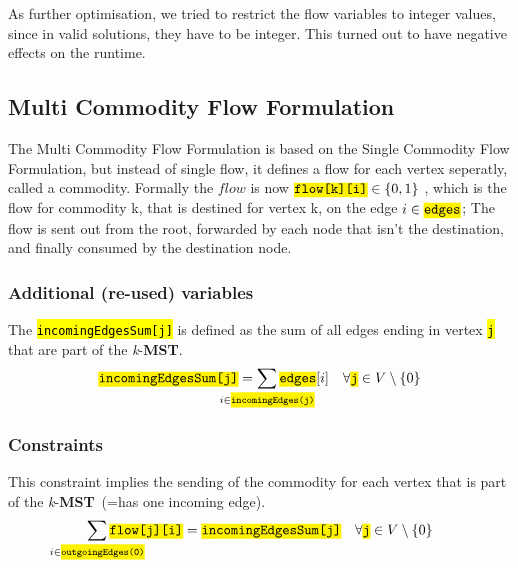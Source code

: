 \documentclass[,%
			paper=a4,%
			DIV14,
			liststotoc,
			bibtotoc,
			draft=false,%
			numbers=noendperiod
			]{scrartcl}
\newcommand{\mst}{\textbf{MST}}
\newcommand{\kmst}{\textit{k}-\mst}
\newcommand{\ilc}[1]{\hl{\texttt{#1}}} %
\newcommand{\commodity}{j}
\newcommand{\edge}{i}
\begin{document}
As further optimisation, we tried to restrict the flow variables to integer values, since in valid solutions, they have to be integer. This turned out to have negative effects on the runtime.

\subsection{Multi Commodity Flow Formulation}
The Multi Commodity Flow Formulation is based on the Single Commodity Flow Formulation, but instead of single flow, it defines a flow for each vertex seperatly, called a commodity. Formally the $flow$ is now $\ilc{flow[k][i]} \in \left\{0,1\right\}$ , which is the flow for commodity k, that is destined for vertex k, on the edge $i \in \ilc{edges}$; The flow is sent out from the root, forwarded by each node that isn't the destination, and finally consumed by the destination node.

\subsubsection{Additional (re-used) variables}
The \ilc{incomingEdgesSum[\commodity]} is defined as the sum of all edges ending in vertex \ilc{\commodity} that are part of the \kmst.
\begin{equation}\label{eq:mfcInEdges}
	\ilc{incomingEdgesSum[\commodity]} = \sum_{\mathclap{i \in \ilc{incomingEdges(\commodity)}}} \ilc{edges}[i]
\quad \forall \ilc{\commodity} \in V \setminus \{0\}
\end{equation}


\subsubsection{Constraints}

This constraint implies the sending of the commodity for each vertex that is part of the \kmst\ (=has one incoming edge).
\begin{equation}\label{eq:mfcSend}
	\sum_{\mathclap{\edge \in \ilc{outgoingEdges(0)}}} \ilc{flow[\commodity][\edge]} = \ilc{incomingEdgesSum[\commodity]}
\quad \forall \ilc{\commodity} \in V  \setminus \{0\}
\end{equation}
\end{document}
